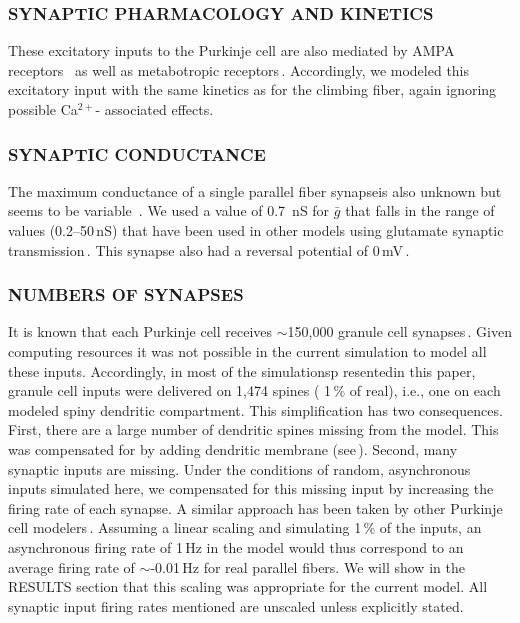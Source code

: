 \documentclass[12pt]{article}
\begin{document}
\subsubsection*{SYNAPTIC PHARMACOLOGY AND KINETICS}

These excitatory inputs to the Purkinje cell are also mediated by AMPA receptors
\,\cite{Farrant:1991hc, Garthwaite:1989ij, Lambolez:1992bs}
as well as metabotropic receptors\,\cite{Blackstone:1989fu, Glaum:1992kl, Vranesic:2qa}. Accordingly,
we modeled this excitatory input with the same kinetics as
for the climbing fiber, again ignoring possible Ca$^{2+}$- associated effects.

\subsubsection*{SYNAPTIC CONDUCTANCE}

The maximum conductance of a
single parallel fiber synapseis also unknown but seems to be variable
\,\cite{Hirano:1986fv, Ito:1989dz}. We used a value of 0.7\,
nS for $\bar g$ that falls in the range of values (0.2--50\,nS) that have been
used in other models using glutamate synaptic transmission\,\cite{R:1989cr, W:1991qa, Miller:1985mi, Rapp-M:1992kx, Wehmeier:1989pi, Wilson:1989ff, Zador:1990lh}.
 This synapse also had a reversal
potential of 0\,mV\,\cite{Cull-Candy:1989oq, Mayer:1987kl}.

\subsubsection*{NUMBERS OF SYNAPSES}

It is known that each Purkinje cell receives
$\sim$150,000 granule cell synapses\,\cite{Harvey:1991xz}.
Given computing resources it was not possible in the
current simulation to model all these inputs. Accordingly, in most
of the simulationsp resentedin this paper, granule cell inputs were
delivered on 1,474 spines ( 1\,\% of real), i.e., one on each modeled
spiny dendritic compartment. This simplification has two consequences.
First, there are a large number of dendritic spines missing
from the model. This was compensated for by adding dendritic
membrane (see\,\cite{R:1989cr, Rapp-M:1992kx}).
Second, many synaptic inputs are missing. Under the conditions
of random, asynchronous inputs simulated here, we compensated
for this missing  input by increasing the firing rate of each synapse.
A similar approach has been taken by other Purkinje cell modelers\,\cite{Rapp-M:1992kx}.
Assuming a linear scaling and simulating 1\,\%
of the inputs, an asynchronous firing rate of 1\,Hz in the model
would thus correspond to an average firing rate of $\sim$-0.01\,Hz for
real parallel fibers. We will show in the RESULTS section that this
scaling was appropriate for the current model. All synaptic input
firing rates mentioned are unscaled unless explicitly stated.
\end{document}

